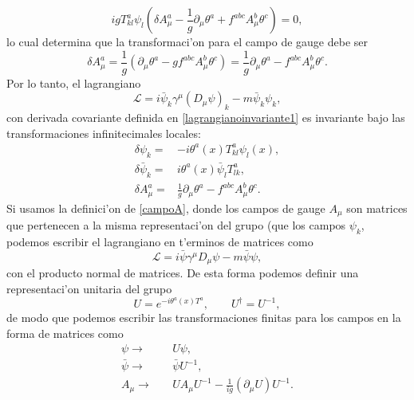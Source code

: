 \begin{equation}
igT^a_{kl}\psi_l(\delta A^a _\mu -\frac{1}{g}\partial_\mu \theta^a+f^{abc}A^b_\mu \theta^c)=0,
\end{equation}
lo cual determina que la transformaci'on para el campo de gauge debe ser
\begin{equation}
\delta A^a_\mu=\frac{1}{g}(\partial_\mu \theta^a-gf^{abc}A^b_\mu \theta^c)=\frac{1}{g}\partial_\mu \theta^a-f^{abc}A^b_\mu \theta^c.
\end{equation}
Por lo tanto, el lagrangiano
\begin{equation}
\mathcal{L}=i\bar{\psi}_k\gamma^\mu (D_\mu \psi)_k-m\bar{\psi}_k\psi_k,
\end{equation}
con derivada covariante definida en \eqref{lagrangianoinvariante1} es invariante bajo las transformaciones infinitecimales locales:
\begin{equation} \label{eq1234}
\begin{aligned}
\delta \psi_k =& -i\theta^a(x)T^a_{kl}\psi_l(x), \\
\delta \bar{\psi}_k =& i\theta^a(x)\bar{\psi}_lT^a_{lk}, \\
\delta A_\mu ^a=& \frac{1}{g}\partial_\mu \theta^a-f^{abc}A_\mu ^b \theta^c.
\end{aligned}
\end{equation}
Si usamos la definici'on de \eqref{campoA}, donde los campos de gauge $A_\mu$ son matrices que pertenecen a la misma representaci'on del grupo (que los campos $\psi_k$, podemos escribir el lagrangiano en t'erminos de matrices como
\begin{equation}
\mathcal{L}=i\bar{\psi}\gamma^\mu D_\mu \psi-m\bar{\psi}\psi,
\end{equation}
con  el producto normal de matrices. De esta forma podemos definir una representaci'on unitaria del grupo
\begin{equation}\label{representacionU}
U=e^{-i\theta^a(x)T^a},\qquad U^\dagger=U^{-1},
\end{equation}
de modo que podemos escribir las transformaciones finitas para los campos en la forma de matrices como
\begin{equation} \label{transformaciones12.38}
\begin{aligned}
\psi\rightarrow &\quad U \psi, \\
\bar{\psi}\rightarrow &\quad \bar{\psi}U^{-1}, \\
A_\mu \rightarrow &\quad UA_\mu U^{-1}-\frac{1}{ig}(\partial_\mu U)U^{-1}.
\end{aligned}
\end{equation}

